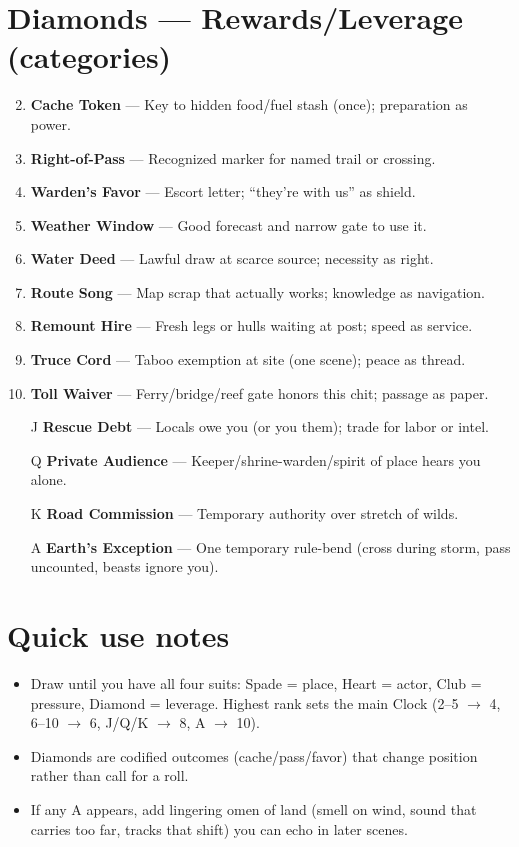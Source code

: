 \section*{Diamonds --- Rewards/Leverage (categories)}
\label{sec:wilderness-rewards}
\begin{enumerate}
\setcounter{enumi}{1}
\item \textbf{Cache Token} --- Key to hidden food/fuel stash (once); preparation as power.
\item \textbf{Right-of-Pass} --- Recognized marker for named trail or crossing.
\item \textbf{Warden's Favor} --- Escort letter; ``they're with us'' as shield.
\item \textbf{Weather Window} --- Good forecast and narrow gate to use it.
\item \textbf{Water Deed} --- Lawful draw at scarce source; necessity as right.
\item \textbf{Route Song} --- Map scrap that actually works; knowledge as navigation.
\item \textbf{Remount Hire} --- Fresh legs or hulls waiting at post; speed as service.
\item \textbf{Truce Cord} --- Taboo exemption at site (one scene); peace as thread.
\item \textbf{Toll Waiver} --- Ferry/bridge/reef gate honors this chit; passage as paper.
\item[J] \textbf{Rescue Debt} --- Locals owe you (or you them); trade for labor or intel.
\item[Q] \textbf{Private Audience} --- Keeper/shrine-warden/spirit of place hears you alone.
\item[K] \textbf{Road Commission} --- Temporary authority over stretch of wilds.
\item[A] \textbf{Earth's Exception} --- One temporary rule-bend (cross during storm, pass uncounted, beasts ignore you).
\end{enumerate}

\section*{Quick use notes}
\label{sec:wilderness-quick-use}
\begin{itemize}
\item Draw until you have all four suits: Spade = place, Heart = actor, Club = pressure, Diamond = leverage. Highest rank sets the main Clock (2--5 $\rightarrow$ 4, 6--10 $\rightarrow$ 6, J/Q/K $\rightarrow$ 8, A $\rightarrow$ 10).
\item Diamonds are codified outcomes (cache/pass/favor) that change position rather than call for a roll.
\item If any A appears, add lingering omen of land (smell on wind, sound that carries too far, tracks that shift) you can echo in later scenes.
\end{itemize}

